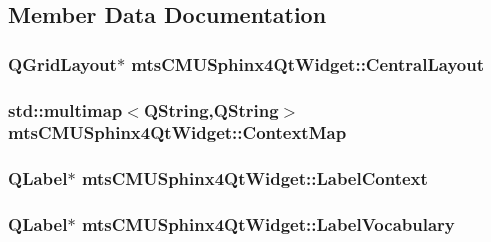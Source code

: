 \subsection{Member Data Documentation}
\hypertarget{classmts_c_m_u_sphinx4_qt_widget_afdd1f19a4fc670f2c558c8f92dc14a6a}{
\subsubsection[{Central\-Layout}]{\setlength{\rightskip}{0pt plus 5cm}Q\-Grid\-Layout$\ast$ mts\-C\-M\-U\-Sphinx4\-Qt\-Widget\-::\-Central\-Layout}}\label{classmts_c_m_u_sphinx4_qt_widget_afdd1f19a4fc670f2c558c8f92dc14a6a}
\hypertarget{classmts_c_m_u_sphinx4_qt_widget_a215fe8155a1355a1c156e2e9e74fdb92}{
\subsubsection[{Context\-Map}]{\setlength{\rightskip}{0pt plus 5cm}std\-::multimap$<$Q\-String,Q\-String$>$ mts\-C\-M\-U\-Sphinx4\-Qt\-Widget\-::\-Context\-Map}}\label{classmts_c_m_u_sphinx4_qt_widget_a215fe8155a1355a1c156e2e9e74fdb92}
\hypertarget{classmts_c_m_u_sphinx4_qt_widget_afcbba988a817bb56ff641dcd339c4edd}{
\subsubsection[{Label\-Context}]{\setlength{\rightskip}{0pt plus 5cm}Q\-Label$\ast$ mts\-C\-M\-U\-Sphinx4\-Qt\-Widget\-::\-Label\-Context}}\label{classmts_c_m_u_sphinx4_qt_widget_afcbba988a817bb56ff641dcd339c4edd}
\hypertarget{classmts_c_m_u_sphinx4_qt_widget_ac33991a517fe078cc31fda51fb9593f2}{
\subsubsection[{Label\-Vocabulary}]{\setlength{\rightskip}{0pt plus 5cm}Q\-Label$\ast$ mts\-C\-M\-U\-Sphinx4\-Qt\-Widget\-::\-Label\-Vocabulary}}\label{classmts_c_m_u_sphinx4_qt_widget_ac33991a517fe078cc31fda51fb9593f2}
